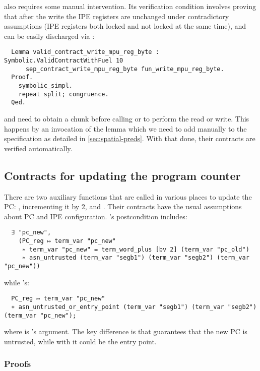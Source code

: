  also requires some manual intervention. Its verification condition involves proving that after the write the IPE registers are unchanged under contradictory assumptions (IPE registers both locked and not locked at the same time), and can be easily discharged via :
\begin{verbatim}
  Lemma valid_contract_write_mpu_reg_byte : Symbolic.ValidContractWithFuel 10
      sep_contract_write_mpu_reg_byte fun_write_mpu_reg_byte.
  Proof.
    symbolic_simpl.
    repeat split; congruence.
  Qed.
\end{verbatim}

 and  need to obtain a  chunk before calling  or  to perform the read or write. This happens by an invocation of the  lemma which we need to add manually to the \usail specification as detailed in \cref{sec:spatial-preds}. With that done, their contracts are verified automatically.

\subsection{Contracts for updating the program counter}

There are two auxiliary functions that are called in various places to update the PC: , incrementing it by 2, and . Their contracts have the usual assumptions about PC and IPE configuration. 's postcondition includes:
\begin{verbatim}
  ∃ "pc_new",
    (PC_reg ↦ term_var "pc_new"
     ∗ term_var "pc_new" = term_word_plus [bv 2] (term_var "pc_old")
     ∗ asn_untrusted (term_var "segb1") (term_var "segb2") (term_var "pc_new"))
\end{verbatim}
while 's:
\begin{verbatim}
  PC_reg ↦ term_var "pc_new"
  ∗ asn_untrusted_or_entry_point (term_var "segb1") (term_var "segb2") (term_var "pc_new");
\end{verbatim}
where  is 's argument. The key difference is that  guarantees that the new PC is untrusted, while with  it could be the entry point.

\subsubsection{Proofs}

